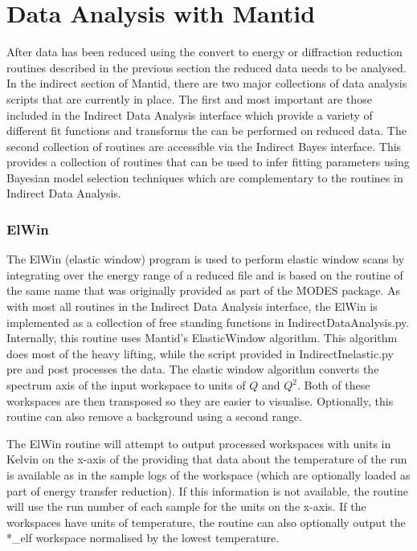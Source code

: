 \documentclass[paper=a4, fontsize=11pt]{scrartcl}	%
\numberwithin{equation}{section}															%
\numberwithin{figure}{section}																%
\numberwithin{table}{section}																%
\begin{document}
\section{Data Analysis with Mantid}
After data has been reduced using the convert to energy or diffraction reduction routines described in the previous section the reduced data needs to be analysed. In the indirect section of Mantid, there are two major collections of data analysis scripts that are currently in place. The first  and most important are those included in the Indirect Data Analysis interface which provide a variety of different fit functions and transforms the can be performed on reduced data. The second collection of routines are accessible via the Indirect Bayes interface. This provides a collection of routines that can be used to infer fitting parameters using Bayesian model selection techniques which are complementary to the routines in Indirect Data Analysis.

\subsubsection{ElWin}
The ElWin (elastic window) program is used to perform elastic window scans by integrating over the energy range of a reduced file and is based on the routine of the same name that was originally provided as part of the MODES package. As with most all routines in the Indirect Data Analysis interface, the ElWin is implemented as a collection of free standing functions in IndirectDataAnalysis.py. Internally, this routine uses Mantid's ElasticWindow algorithm. This algorithm does most of the heavy lifting, while the script provided in IndirectInelastic.py pre and post processes the data. The elastic window algorithm converts the spectrum axis of the input workspace to units of $Q$ and $Q^2$. Both of these workspaces are then transposed so they are easier to visualise. Optionally, this routine can also remove a background using a second range.

The ElWin routine will attempt to output processed workspaces with units in Kelvin on the x-axis of the  providing that data about the temperature of the run is available as in the sample logs of the workspace (which are optionally loaded as part of energy transfer reduction). If this information is not available, the routine will use the run number of each sample for the units on the x-axis. If the workspaces have units of temperature, the routine can also optionally output the \**\_elf workspace normalised by the lowest temperature.
\end{document}
